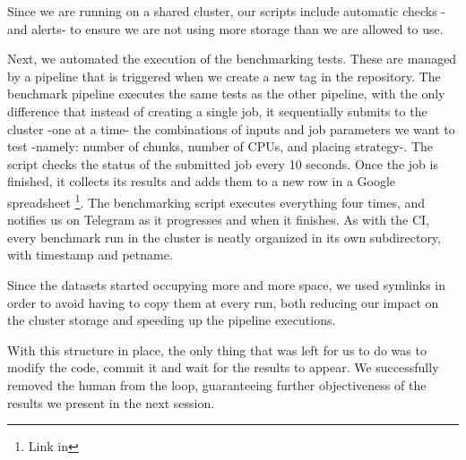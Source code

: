 Since we are running on a shared cluster, our scripts include automatic checks -and alerts- to ensure we are not using more storage than we are allowed to use.

\vspace{0.2cm}

Next, we automated the execution of the benchmarking tests.
These are managed by a pipeline that is triggered when we create a new tag in the repository.
The benchmark pipeline executes the same tests as the other pipeline, with the only difference that instead of creating a single job, it sequentially submits to the cluster -one at a time- the combinations of inputs and job parameters we want to test -namely: number of chunks, number of CPUs, and placing strategy-. The script checks the status of the submitted job every 10 seconds. Once the job is finished, it collects its results and adds them to a new row in a Google spreadsheet
\footnote{Link in }.
The benchmarking script executes everything four times, and notifies us on Telegram as it progresses and when it finishes.
As with the CI, every benchmark run in the cluster is neatly organized in its own subdirectory, with timestamp and petname.

Since the datasets started occupying more and more space, we used symlinks in order to avoid having to copy them at every run, both reducing our impact on the cluster storage and speeding up the pipeline executions.

With this structure in place, the only thing that was left for us to do was to modify the code, commit it and wait for the results to appear. We successfully removed the human from the loop, guaranteeing further objectiveness of the results we present in the next session.
